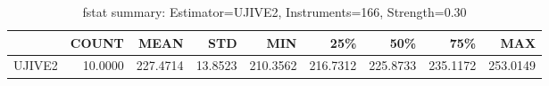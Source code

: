 \begin{table}[ht]
\centering
\caption{fstat summary: Estimator=UJIVE2, Instruments=166, Strength=0.30}
\begin{tabular}{lrrrrrrrr}
\toprule
 & COUNT & MEAN & STD & MIN & 25\% & 50\% & 75\% & MAX \\
\midrule
UJIVE2 & 10.0000 & 227.4714 & 13.8523 & 210.3562 & 216.7312 & 225.8733 & 235.1172 & 253.0149 \\
\bottomrule
\end{tabular}
\end{table}
